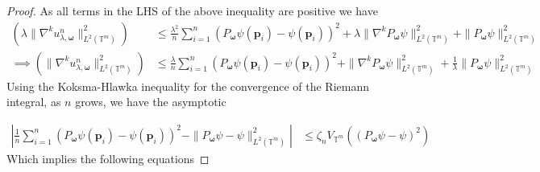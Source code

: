 \documentclass[multixcb]{amstext-l}
\theoremstyle{plain}
\theoremstyle{definition}
\theoremstyle{definition}
\theoremstyle{remark}
\numberwithin{equation}{chapter}
\begin{document}
\begin{proof}
As all terms in the LHS of the above inequality are positive we have   %
\begin{equation}\label{EQ_4_6}
\begin{aligned}
\left( \lambda\|\nabla^ku_{\lambda,\boldsymbol{\omega}}^n\|_{L^2(\mathbb{T}^m)}^2 \right) &\le \frac{\lambda^2}{n}\sum\limits_{i=1}^{n}(P_{\boldsymbol{\omega}}\psi(\boldsymbol{p}_i)-\psi(\boldsymbol{p}_i))^2 + \lambda\|\nabla^kP_{\boldsymbol{\omega}}\psi\|_{L^2(\mathbb{T}^m)}^2 + \|P_{\boldsymbol{\omega}}\psi\|_{L^2(\mathbb{T}^m)}^2 \\
\implies  \left( \|\nabla^ku_{\lambda,\boldsymbol{\omega}}^n\|_{L^2(\mathbb{T}^m)}^2 \right) &\le \frac{\lambda}{n}\sum\limits_{i=1}^{n}(P_{\boldsymbol{\omega}}\psi(\boldsymbol{p}_i)-\psi(\boldsymbol{p}_i))^2 + \|\nabla^kP_{\boldsymbol{\omega}}\psi\|_{L^2(\mathbb{T}^m)}^2 + \frac{1}{\lambda}\|P_{\boldsymbol{\omega}}\psi\|_{L^2(\mathbb{T}^m)}^2
\end{aligned}
\end{equation}
Using the Koksma-Hlawka inequality \cite{kuipers2012uniform} for the convergence of the Riemann integral, as $n$ grows, we have the asymptotic 
   
    
    \begin{equation}\label{IQ_1}\begin{aligned}
    \left|\frac{1}{n}\sum\limits_{i=1}^{n}(P_{\boldsymbol{\omega}}\psi(\boldsymbol{p}_i)-\psi(\boldsymbol{p}_i))^2  - \|P_{\boldsymbol{\omega}}\psi-\psi\|^2_{L^2(\mathbb{T}^m)} \right| &\le  \zeta_n V_{\mathbb{T}^m}((P_{\boldsymbol{\omega}}\psi-\psi)^2)
    \end{aligned}\end{equation}
    Which implies the following equations
    

\end{proof}
\end{document}
